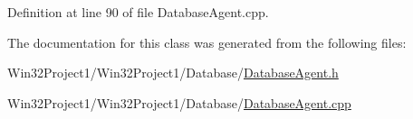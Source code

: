 Definition at line 90 of file Database\+Agent.\+cpp.



The documentation for this class was generated from the following files\+:\begin{DoxyCompactItemize}
\item 
Win32\+Project1/\+Win32\+Project1/\+Database/\hyperlink{_database_agent_8h}{Database\+Agent.\+h}\item 
Win32\+Project1/\+Win32\+Project1/\+Database/\hyperlink{_database_agent_8cpp}{Database\+Agent.\+cpp}\end{DoxyCompactItemize}
